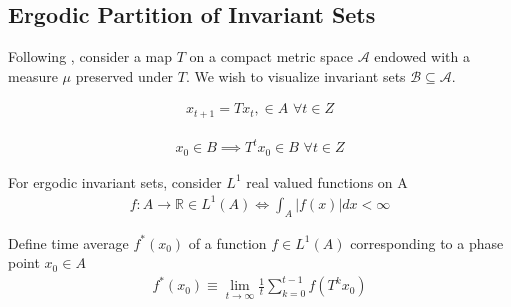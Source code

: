 \documentclass[12pt]{article}
\begin{document}

\subsection{Ergodic Partition of Invariant Sets}
\label{sec:ergod-part-invar}

Following \citep{ergodicvisual}, consider a map $T$ on a compact metric space $\mathcal{A}$ endowed with a measure $\mu$ preserved under $T$. We wish to 
visualize invariant sets $\mathcal{B} \subseteq \mathcal{A}$.

\begin{gather*}
  x_{t+1} =T x_t,\in A\,\,\forall t \in Z
\end{gather*}

\begin{gather*}
  x_0 \in B \implies T^t x_0 \in B \,\,\forall t \in Z
\end{gather*}

For ergodic invariant sets, consider $L^1$ real valued functions on A
\begin{gather*}
 f:A \rightarrow \mathbb{R}\in L^1(A) \iff \int_A |f(x)|dx <\infty
\end{gather*}

Define time average $f^\ast(x_0)$ of a function $f\in L^1(A)$ corresponding to a phase point $x_0\in A$
\begin{gather*}
  f^\ast(x_0)\equiv \lim_{t\rightarrow\infty} \frac{1}{t}\sum_{k=0}^{t-1}f(T^kx_0)
\end{gather*}
\end{document}
